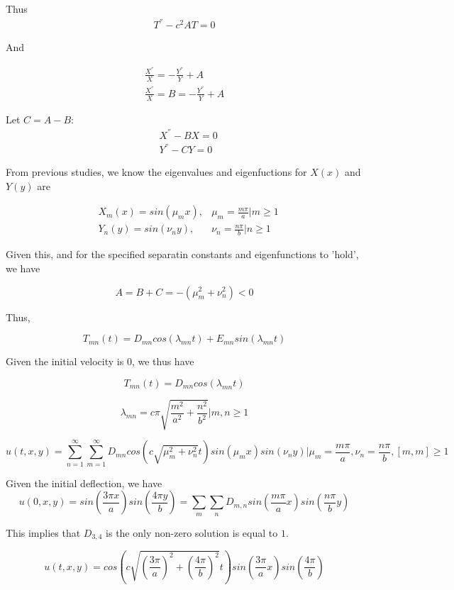 \documentclass{article}
\begin{document}
Thus
\begin{align*}
T^{''}-c^2AT=0
\end{align*}

And

\begin{align*}
\frac{X^{''}}{X} = - \frac{Y^{''}}{Y} + A\\
\frac{X^{''}}{X} = B = - \frac{Y^{''}}{Y} + A
\end{align*}

Let $C = A-B$:
\begin{align*}
&X^{''} - BX=0\\
&Y^{''} - CY=0
\end{align*}

From previous studies, we know the eigenvalues and eigenfuctions for $X(x)$ and $Y(y)$ are

\begin{align*}
&X_m(x) = sin\left( \mu_mx\right), & \mu_m = \frac{m\pi}{a}\Bigr| m \geq 1\\
&Y_n(y) = sin\left( \nu_ny\right), & \nu_n = \frac{n\pi}{b}\Bigr| n \geq 1
\end{align*}

Given this, and for the specified separatin constants and eigenfunctions to 'hold', we have

$$A=B+C=-(\mu_m^2+\nu_n^2) <0$$

Thus,

$$T_{mn}(t)=D_{mn}cos\left(\lambda_{mn}t\right)+E_{mn}sin\left(\lambda_{mn}t\right)$$

Given the initial velocity is 0, we thus have

$$T_{mn}(t)=D_{mn}cos\left(\lambda_{mn}t\right)$$

$$\lambda_{mn}=c \pi \sqrt{\frac{m^2}{a^2}+\frac{n^2}{b^2}}\Bigr| m,n \geq 1$$

$$u(t,x,y) = \sum_{n=1}^{\infty} \sum_{m=1}^{\infty} D_{mn}cos\left(c\sqrt{\mu_m^2 + \nu_n^2}t\right) sin\left( \mu_mx\right) sin\left( \nu_ny\right)\Bigr|\mu_m = \frac{m\pi}{a}, \nu_n = \frac{n \pi}{b}, [m,m]\geq 1$$


Given the initial deflection, we have
$$u(0,x,y) = sin\left(\frac{3\pi x}{a}\right)sin\left(\frac{4\pi y}{b}\right) = \sum_{m} \sum_{n} D_{m,n}sin\left( \frac{m\pi}{a} x\right) sin\left( \frac{n \pi}{b} y\right)$$

This implies that $D_{3,4}$ is the only non-zero solution is equal to $1$.

$$u(t,x,y) = cos\left( c \sqrt{ \left(\frac{3 \pi}{a}\right)^2 + \left(\frac{4 \pi}{b}\right)^2}t\right)sin\left(\frac{3\pi}{a}x\right)sin\left(\frac{4\pi}{b}\right)$$
\end{document}
